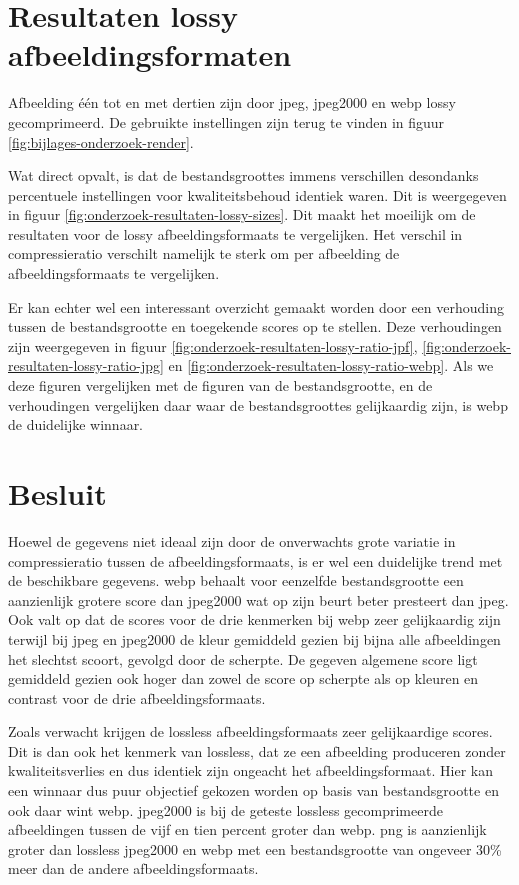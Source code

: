 \section{Resultaten lossy afbeeldingsformaten}
\label{sec:onderzoek-resultaten-lossy}

Afbeelding één tot en met dertien zijn door \gls{jpeg}, \gls{jpeg2000} en \gls{webp} \gls{lossy} gecomprimeerd. De gebruikte instellingen zijn terug te vinden in figuur \ref{fig:bijlages-onderzoek-render}.

Wat direct opvalt, is dat de bestandsgroottes immens verschillen desondanks percentuele instellingen voor kwaliteitsbehoud identiek waren. Dit is weergegeven in figuur \ref{fig:onderzoek-resultaten-lossy-sizes}. Dit maakt het moeilijk om de resultaten voor de \gls{lossy} \glspl{afbeeldingsformaat} te vergelijken. Het verschil in \gls{compressieratio} verschilt namelijk te sterk om per afbeelding de \glspl{afbeeldingsformaat} te vergelijken. 

Er kan echter wel een interessant overzicht gemaakt worden door een verhouding tussen de bestandsgrootte en toegekende scores op te stellen. Deze verhoudingen zijn weergegeven in figuur \ref{fig:onderzoek-resultaten-lossy-ratio-jpf}, \ref{fig:onderzoek-resultaten-lossy-ratio-jpg} en \ref{fig:onderzoek-resultaten-lossy-ratio-webp}. Als we deze figuren vergelijken met de figuren van de bestandsgrootte, en de verhoudingen vergelijken daar waar de bestandsgroottes gelijkaardig zijn, is \gls{webp} de duidelijke winnaar.

\section{Besluit}
\label{sec:onderzoek-besluit}

Hoewel de gegevens niet ideaal zijn door de onverwachts grote variatie in compressieratio tussen de \glspl{afbeeldingsformaat}, is er wel een duidelijke trend met de beschikbare gegevens. \Gls{webp} behaalt voor eenzelfde bestandsgrootte een aanzienlijk grotere score dan \gls{jpeg2000} wat op zijn beurt beter presteert dan \gls{jpeg}. Ook valt op dat de scores voor de drie kenmerken bij \gls{webp} zeer gelijkaardig zijn terwijl bij \gls{jpeg} en \gls{jpeg2000} de kleur gemiddeld gezien bij bijna alle afbeeldingen het slechtst scoort, gevolgd door de scherpte. De gegeven algemene score ligt gemiddeld gezien ook hoger dan zowel de score op scherpte als op kleuren en contrast voor de drie \glspl{afbeeldingsformaat}.

Zoals verwacht krijgen de \gls{lossless} \glspl{afbeeldingsformaat} zeer gelijkaardige scores. Dit is dan ook het kenmerk van \gls{lossless}, dat ze een afbeelding produceren zonder kwaliteitsverlies en dus identiek zijn ongeacht het \gls{afbeeldingsformaat}. Hier kan een winnaar dus puur objectief gekozen worden op basis van bestandsgrootte en ook daar wint \gls{webp}. \Gls{jpeg2000} is bij de geteste \gls{lossless} gecomprimeerde afbeeldingen tussen de vijf en tien percent groter dan \gls{webp}. \Gls{png} is aanzienlijk groter dan \gls{lossless} \gls{jpeg2000} en \gls{webp} met een bestandsgrootte van ongeveer 30\% meer dan de andere \glspl{afbeeldingsformaat}.

